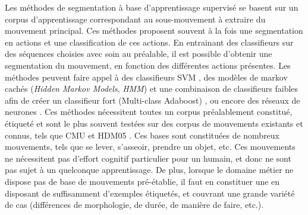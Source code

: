 Les méthodes de segmentation à base d'apprentissage supervisé se basent sur un corpus d'apprentissage correspondant au sous-mouvement à extraire du mouvement principal. Ces méthodes proposent souvent à la fois une segmentation en actions et une classification de ces actions. En entrainant des classifieurs sur des séquences choisies avec soin au préalable, il est possible d'obtenir une segmentation du mouvement, en fonction des différentes actions présentes. Les méthodes peuvent faire appel à des classifieurs SVM \parencite{Hoai2011Seg}, des modèles de markov cachés (\textit{Hidden Markov Models}, \textit{HMM}) et une combinaison de classifieurs faibles afin de créer un classifieur fort (Multi-class Adaboost) \parencite{Fengjun2006Ada}, ou encore des réseaux de neurones \parencite{Bouchard2007SSM}. Ces méthodes nécessitent toutes un corpus préalablement constitué, étiqueté et sont le plus souvent testées sur des corpus de mouvements existants et connus, tels que CMU \parencite{CMUDatabase} et HDM05 \parencite{HDM05Database}. Ces bases sont constituées de nombreux mouvements, tels que se lever, s'asseoir, prendre un objet, etc. Ces mouvements ne nécessitent pas d'effort cognitif particulier pour un humain, et donc ne sont pas sujet à un quelconque apprentissage. De plus, lorsque le domaine métier ne dispose pas de base de mouvements pré-établie, il faut en constituer une en disposant de suffisamment d'exemples étiquetés, et couvrant une grande variété de cas (différences de morphologie, de durée, de manière de faire, etc.).

